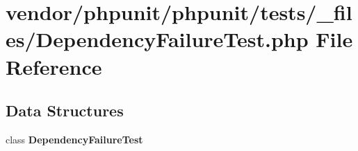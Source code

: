 \section{vendor/phpunit/phpunit/tests/\+\_\+files/\+Dependency\+Failure\+Test.php File Reference}
\label{_dependency_failure_test_8php}
\subsection*{Data Structures}
\begin{DoxyCompactItemize}
\item 
class {\bf Dependency\+Failure\+Test}
\end{DoxyCompactItemize}
